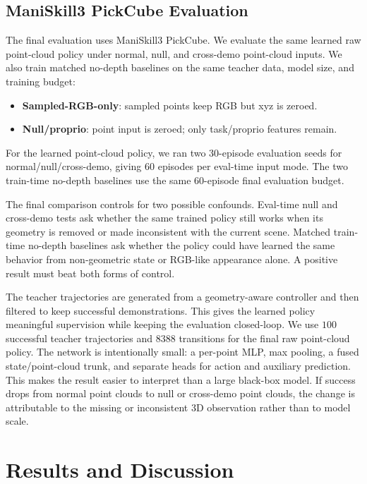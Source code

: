 \documentclass[conference]{IEEEtran}
\begin{document}
\subsection{ManiSkill3 PickCube Evaluation}

The final evaluation uses ManiSkill3 PickCube. We evaluate the same learned raw point-cloud policy under normal, null, and cross-demo point-cloud inputs. We also train matched no-depth baselines on the same teacher data, model size, and training budget:
\begin{itemize}
\item \textbf{Sampled-RGB-only}: sampled points keep RGB but xyz is zeroed.
\item \textbf{Null/proprio}: point input is zeroed; only task/proprio features remain.
\end{itemize}

For the learned point-cloud policy, we ran two 30-episode evaluation seeds for normal/null/cross-demo, giving 60 episodes per eval-time input mode. The two train-time no-depth baselines use the same 60-episode final evaluation budget.

The final comparison controls for two possible confounds. Eval-time null and cross-demo tests ask whether the same trained policy still works when its geometry is removed or made inconsistent with the current scene. Matched train-time no-depth baselines ask whether the policy could have learned the same behavior from non-geometric state or RGB-like appearance alone. A positive result must beat both forms of control.

The teacher trajectories are generated from a geometry-aware controller and then filtered to keep successful demonstrations. This gives the learned policy meaningful supervision while keeping the evaluation closed-loop. We use $100$ successful teacher trajectories and $8388$ transitions for the final raw point-cloud policy. The network is intentionally small: a per-point MLP, max pooling, a fused state/point-cloud trunk, and separate heads for action and auxiliary prediction. This makes the result easier to interpret than a large black-box model. If success drops from normal point clouds to null or cross-demo point clouds, the change is attributable to the missing or inconsistent 3D observation rather than to model scale.

\section{Results and Discussion}
\end{document}

